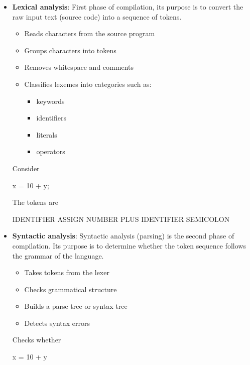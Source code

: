\documentclass{report}
\begin{document}
    \pagebreak 
    \begin{itemize}
        \item \textbf{Lexical analysis}: First phase of compilation, its purpose is to convert the raw input text (source code) into a sequence of tokens. 
            \begin{itemize}
                \item Reads characters from the source program
                \item Groups characters into tokens
                \item Removes whitespace and comments
                \item Classifies lexemes into categories such as:
                \begin{itemize}
                    \item keywords
                    \item identifiers
                    \item literals
                    \item operators
                \end{itemize}
            \end{itemize}
            Consider
            \begin{cppcode}
            x = 10 + y;
            \end{cppcode}
            \bigbreak \noindent 
            The tokens are
            \begin{center}
                IDENTIFIER ASSIGN NUMBER PLUS IDENTIFIER SEMICOLON
            \end{center}
        \item \textbf{Syntactic analysis}: Syntactic analysis (parsing) is the second phase of compilation. Its purpose is to determine whether the token sequence follows the grammar of the language.
            \begin{itemize}
                \item Takes tokens from the lexer
                \item Checks grammatical structure
                \item Builds a parse tree or syntax tree
                \item Detects syntax errors
            \end{itemize}
            Checks whether 
            \bigbreak \noindent 
            \begin{cppcode}
            x = 10 + y

\end{cppcode}
\end{itemize}
\end{document}
